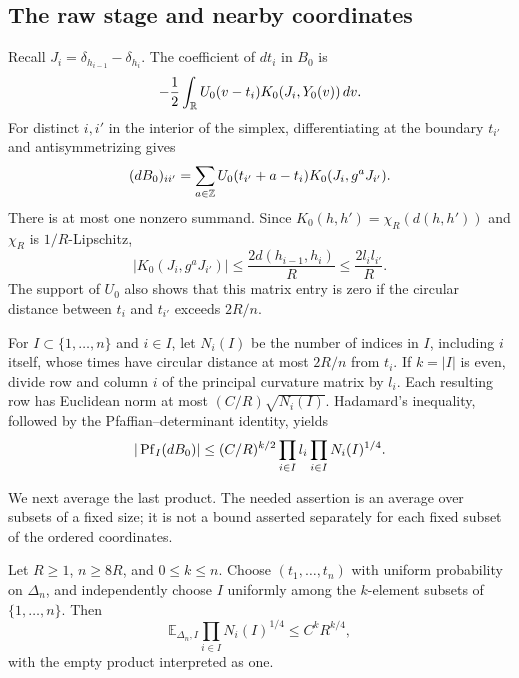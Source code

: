 \subsection{The raw stage and nearby coordinates}

Recall $J_i=\delta_{h_{i-1}}-\delta_{h_i}$.  The coefficient of $dt_i$
in $B_0$ is
\[
 -\frac12\int_{\mathbb R}U_0(v-t_i)K_0(J_i,Y_0(v))\,dv.
\]
For distinct $i,i'$ in the interior of the simplex, differentiating
at the boundary $t_{i'}$ and antisymmetrizing gives
\[
 (dB_0)_{ii'}
 =\sum_{a\in\mathbb Z}U_0(t_{i'}+a-t_i)K_0(J_i,g^aJ_{i'}).
\]
There is at most one nonzero summand.  Since
$K_0(h,h')=\chi_R(d(h,h'))$ and $\chi_R$ is $1/R$-Lipschitz,
\[
 |K_0(J_i,g^aJ_{i'})|
 \le\frac{2d(h_{i-1},h_i)}R
 \le\frac{2l_i l_{i'}}R.
\]
The support of $U_0$ also shows that this matrix entry is zero if the
circular distance between $t_i$ and $t_{i'}$ exceeds $2R/n$.

For $I\subset\{1,\ldots,n\}$ and $i\in I$, let $N_i(I)$ be the
number of indices in $I$, including $i$ itself, whose times have
circular distance at most $2R/n$ from $t_i$.  If $k=|I|$ is even,
divide row and column $i$ of the principal curvature matrix by $l_i$.
Each resulting row has Euclidean norm at most
$(C/R)\sqrt{N_i(I)}$.  Hadamard's inequality, followed by the
Pfaffian--determinant identity, yields
\begin{equation}
 |\operatorname{Pf}_I(dB_0)|
 \le (C/R)^{k/2}\prod_{i\in I}l_i
                    \prod_{i\in I}N_i(I)^{1/4}.
 \label{pf:raw}
\end{equation}

We next average the last product.  The needed assertion is an average
over subsets of a fixed size; it is not a bound asserted separately
for each fixed subset of the ordered coordinates.

\begin{lemma}
\label{pf:occupancy}
Let $R\ge1$, $n\ge8R$, and $0\le k\le n$.  Choose
$(t_1,\ldots,t_n)$ with uniform probability on $\Delta_n$, and
independently choose $I$ uniformly among the $k$-element subsets of
$\{1,\ldots,n\}$.  Then
\begin{equation}
 \mathbb E_{\Delta_n,I}\prod_{i\in I}N_i(I)^{1/4}
 \le C^k R^{k/4},
 \label{pf:count-average}
\end{equation}
with the empty product interpreted as one.
\end{lemma}

